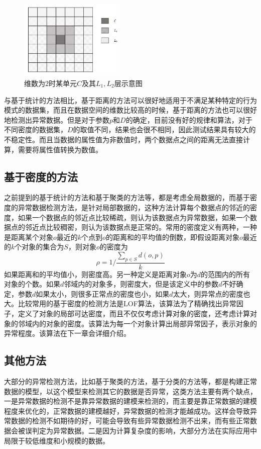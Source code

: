\begin{figure}
	\centering
	\includegraphics[width=0.45\textwidth]{figures/figure2x2}
	\caption{维数为$2$时某单元$C$及其$L_1,L_2$层示意图}\label{fig:fig22}
\end{figure}

与基于统计的方法相比，基于距离的方法可以很好地适用于不满足某种特定的行为模式的数据集，而且在数据空间的维数比较高的时候，基于距离的方法也可以很好地检测出异常数据。但是对于参数$p$和$D$的确定，目前没有好的规律和算法，对于不同密度的数据集，$D$的取值不同，结果也会很不相同，因此测试结果具有较大的不稳定性。而且当数据的属性值为非数值时，两个数据点之间的距离无法直接计算，需要将属性值转换为数值。

\subsection{基于密度的方法}
之前提到的基于统计的方法和基于聚类的方法等，都是考虑全局数据的，而基于密度的异常数据检测方法，是针对局部数据的，这种方法计算每个数据点的邻近的密度，如果一个数据点的邻近点比较稀疏，则认为该数据点为异常数据，如果一个数据点的邻近点比较稠密，则认为该数据点是正常的。常用的密度定义有两种，一种是距离某个对象$o$最近的$k$个点到$o$的距离和的平均值的倒数，即假设距离对象$o$最近的$k$个对象的集合为$S$，则对象$o$的密度为
\begin{equation}
\rho = 1 / \frac{\sum_{p\in S}d(o,p)}{k}
\end{equation}
如果距离和的平均值小，则密度高。另一种定义是距离对象$o$为$d$的范围内的所有对象的个数。如果$d$邻域内的对象多，则密度大，但是该定义中的参数$d$不好确定，参数$d$如果太小，则很多正常点的密度也小，如果$d$太大，则异常点的密度也大。比较常用的基于密度的检测方法是LOF算法，该算法为了精确找出异常因子，定义了对象的局部可达密度，而且不仅仅考虑计算对象的密度，还考虑计算对象的邻域内的对象的密度。该算法为每一个对象计算出局部异常因子，表示对象的异常程度。该算法在下一章会详细介绍。

\subsection{其他方法}
大部分的异常检测方法，比如基于聚类的方法，基于分类的方法等，都是构建正常数据的模型，以这个模型来检测其它的数据是否异常，这类方法主要有两个缺点，一是异常数据的检测不是靠异常数据的建模来检测的，而主要是靠正常数据的建模程度来优化的，正常数据的建模越好，异常数据的检测才能越成功。这样会导致异常数据的检测不如期待的好，可能会导致有些异常数据检测不出来，而有些正常数据会被误判定为异常数据。二是因为计算复杂度的影响，大部分方法在实际应用中局限于较低维度和小规模的数据。

